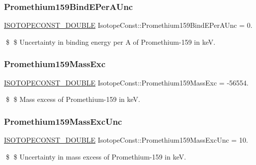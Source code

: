 \subsubsection{\texorpdfstring{Promethium159\+Bind\+E\+Per\+A\+Unc}{Promethium159BindEPerAUnc}}
{\footnotesize\ttfamily \mbox{\hyperlink{group___isotope_const-_macros_ga8f45a7272ce02c0b4c65c44636ed719a}{I\+S\+O\+T\+O\+P\+E\+C\+O\+N\+S\+T\+\_\+\+D\+O\+U\+B\+LE}} Isotope\+Const\+::\+Promethium159\+Bind\+E\+Per\+A\+Unc = 0.}

\$ \$ Uncertainty in binding energy per A of Promethium-\/159 in keV. \mbox{\label{group___isotope_const-_promethium-_pm159_ga0db2b8c1d0f9290cad7ff395f56326e4}} 
\subsubsection{\texorpdfstring{Promethium159\+Mass\+Exc}{Promethium159MassExc}}
{\footnotesize\ttfamily \mbox{\hyperlink{group___isotope_const-_macros_ga8f45a7272ce02c0b4c65c44636ed719a}{I\+S\+O\+T\+O\+P\+E\+C\+O\+N\+S\+T\+\_\+\+D\+O\+U\+B\+LE}} Isotope\+Const\+::\+Promethium159\+Mass\+Exc = -\/56554.}

\$ \$ Mass excess of Promethium-\/159 in keV. \mbox{\label{group___isotope_const-_promethium-_pm159_ga1c462119a9f7708f566fb8e2740a0286}} 
\subsubsection{\texorpdfstring{Promethium159\+Mass\+Exc\+Unc}{Promethium159MassExcUnc}}
{\footnotesize\ttfamily \mbox{\hyperlink{group___isotope_const-_macros_ga8f45a7272ce02c0b4c65c44636ed719a}{I\+S\+O\+T\+O\+P\+E\+C\+O\+N\+S\+T\+\_\+\+D\+O\+U\+B\+LE}} Isotope\+Const\+::\+Promethium159\+Mass\+Exc\+Unc = 10.}

\$ \$ Uncertainty in mass excess of Promethium-\/159 in keV. \mbox{\label{group___isotope_const-_promethium-_pm159_ga6194f8ebd2f4954236816671ea685a3f}} 
